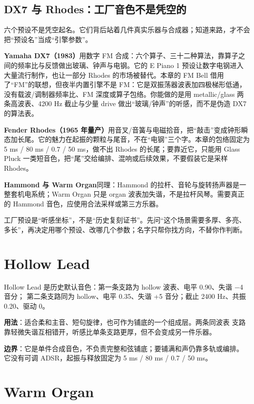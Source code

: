 \subsection{DX7 与 Rhodes：工厂音色不是凭空的}

六个预设不是凭空起名。它们背后站着几件真实乐器与合成器；知道来路，才不会把“预设名”当成“引擎参数”。

\textbf{Yamaha DX7（1983）}用数字 FM 合成：六个算子、三十二种算法，靠算子之间的频率比与反馈做出玻璃、钟声与电钢。它的 E Piano 1 预设让数字电钢进入大量流行制作，也让一部分 Rhodes 的市场被替代。本章的 FM Bell 借用了“FM”的联想，但夜半内置引擎不是 FM：它是双振荡器波表加四极梯形低通，没有载波/调制器频率比、FM 深度或算子包络。你能做的是用 metallic/glass 两条高波表、4200 Hz 截止与少量 drive 做出“玻璃/钟声”的听感，而不是伪造 DX7 的算法表。

\textbf{Fender Rhodes（1965 年量产）}用音叉/音簧与电磁拾音，把“敲击”变成钟形瞬态加长尾。它的魅力在起振的颗粒与尾音，不在“电钢”三个字。本章的包络固定为 5 ms / 80 ms / 0.7 / 50 ms，做不出 Rhodes 的长尾；要靠近它，只能用 Glass Pluck 一类短音色，把“尾”交给编排、混响或后续效果，不要假装它是采样 Rhodes。

\textbf{Hammond 与 Warm Organ}同理：Hammond 的拉杆、音轮与旋转扬声器是一整套机电系统；Warm Organ 只是 organ 波表加失谐，不是拉杆风琴。需要真正的 Hammond 音色，应使用合法采样或第三方乐器。

工厂预设是“听感坐标”，不是“历史复刻证书”。先问“这个场景需要多厚、多亮、多长”，再决定用哪个预设、改哪几个参数；名字只帮你找方向，不替你作判断。

\section{Hollow Lead}

Hollow Lead 是历史默认音色：第一条支路为 hollow 波表、电平 0.90、失谐 −4 音分；
第二条支路同为 hollow、电平 0.35、失谐 +5 音分；截止 2400 Hz、共振 0.20、驱动 0。

\textbf{用法}：适合柔和主音、短句旋律，也可作为铺底的一个组成层。两条同波表
支路靠轻微失谐互相错开，听感比单条支路更厚，但不会变成另一件乐器。

\textbf{边界}：它是单件合成音色，不负责完整和弦铺底；要铺满和声仍靠多轨或编排。
它没有可调 ADSR，起振与释放固定为 5 ms / 80 ms / 0.7 / 50 ms。

\section{Warm Organ}

